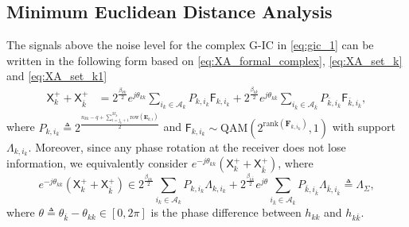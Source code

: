 \documentclass[12pt, draftclsnofoot, onecolumn]{IEEEtran}
\newcommand{\msf}[1]{\mathsf{#1}}
\theoremstyle{definition}
\begin{document}
\subsection{Minimum Euclidean Distance Analysis}
The signals above the noise level for the complex G-IC in \eqref{eq:gic_1} can be written in the following form based on \eqref{eq:XA_formal_complex}, \eqref{eq:XA_set_k} and \eqref{eq:XA_set_k1}
\begin{align}
\msf{X}_k^{+}+\msf{X}_{\bar{k}}^{+}&= 2^{\frac{\beta_{kk}}{2}}e^{j \theta_{kk}}\sum_{i_k \in\mathcal{A}_k}P_{k,i_k}\msf{F}_{k,i_k} + 2^{\frac{\beta_{k\bar{k}}}{2}}e^{j \theta_{k\bar{k}}}\sum_{i_{\bar{k}} \in\mathcal{A}_{\bar{k}}}P_{{\bar{k}},i_{\bar{k}}}\msf{F}_{{\bar{k}},i_{\bar{k}}},
\end{align}
where $P_{k,i_k}\triangleq 2^{\frac{n_{kk}-q+\sum_{i=j_k+1}^{M_k}\text{row}(\boldsymbol{E}_{k,i})}{2}}$ and $\msf{F}_{k,i_k}\sim \text{QAM}(2^{\text{rank}(\boldsymbol{F}_{k,i_k})},1)$ with support $\Lambda_{k,i_k}$. Moreover, since any phase rotation at the receiver does not lose information, we equivalently consider $e^{-j \theta_{kk}}(\msf{X}_k^{+}+\msf{X}_{\bar{k}}^{+})$, where
\begin{equation}\label{eq:const_XA_equivalent}
    e^{-j \theta_{kk}}(\msf{X}_k^{+}+\msf{X}_{\bar{k}}^{+}) \in 2^{\frac{\beta_{kk}}{2}}\sum_{i_k \in\mathcal{A}_k}P_{k,i_k}\Lambda_{k,i_k} + 2^{\frac{\beta_{k\bar{k}}}{2}}e^{j \theta}\sum_{i_{\bar{k}} \in\mathcal{A}_{\bar{k}}}P_{{\bar{k}},i_{\bar{k}}}\Lambda_{{\bar{k}},i_{\bar{k}}} \triangleq \Lambda_{\Sigma},
\end{equation}
where $\theta\triangleq \theta_{\bar{k}}-\theta_{kk} \in[0,2\pi]$ is the phase difference between $h_{kk}$ and $h_{k\bar{k}}$.
\end{document}
